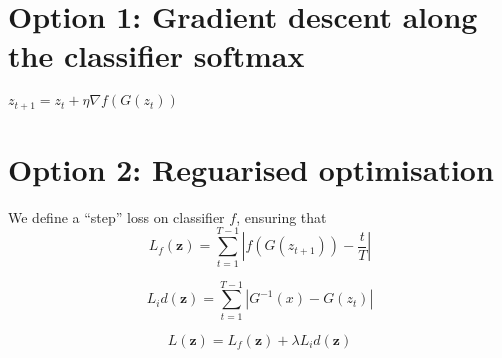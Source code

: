 \documentclass{article}
\begin{document}
\section{Option 1: Gradient descent along the classifier softmax}

$z_{t+1} = z_t + \eta \nabla f(G(z_t))$


\section{Option 2: Reguarised optimisation}

\newcommand{\bz}{\textbf{z}}



We define a ``step'' loss on classifier $f$, ensuring that 
\begin{equation}
L_f(\bz) = \sum_{t=1}^{T-1} |f(G(z_{t+1})) - \frac{t}{T}| 
\end{equation}

\begin{equation}
L_id(\bz) = \sum_{t=1}^{T-1} |G^{-1}(x) - G(z_t)| 
\end{equation}


\begin{equation}
L(\bz) = L_f(\bz) + \lambda L_id(\bz) 
\end{equation}










% 
% 
% 
\end{document}
